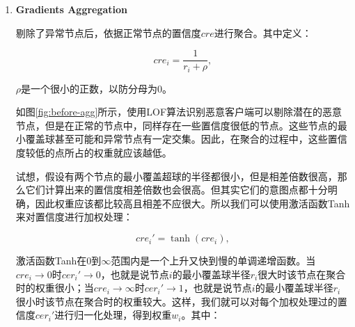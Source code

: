 \documentclass[lettersize,journal]{IEEEtran}
\begin{document}
\begin{enumerate}




\item \textbf{Gradients Aggregation}

剔除了异常节点后，依据正常节点的置信度$cre$进行聚合。其中定义：

\begin{equation}
    cre_i=\frac{1}{r_i+\rho},
\end{equation}

$\rho$是一个很小的正数，以防分母为$0$。

如图\ref{fig:before-agg}所示，使用LOF算法识别恶意客户端可以剔除潜在的恶意节点，但是在正常的节点中，同样存在一些置信度很低的节点。这些节点的最小覆盖球甚至可能和异常节点有一定交集。因此，在聚合的过程中，这些置信度较低的点所占的权重就应该越低。

试想，假设有两个节点的最小覆盖超球的半径都很小，但是相差倍数很高，那么它们计算出来的置信度相差倍数也会很高。但其实它们的意图点都十分明确，因此权重应该都比较高且相差不应很大。所以我们可以使用激活函数Tanh来对置信度进行加权处理：

\begin{equation}
    cre_i'=\tanh(cre_i),
\end{equation}

激活函数Tanh在$0$到$\infty$范围内是一个上升又快到慢的单调递增函数。当$cre_i\to 0$时$cer_i'\to 0$，也就是说节点$i$的最小覆盖球半径$r_i$很大时该节点在聚合时的权重很小；当$cre_i\to \infty$时$cer_i'\to 1$，也就是说节点$i$的最小覆盖球半径$r_i$很小时该节点在聚合时的权重较大。这样，我们就可以对每个加权处理过的置信度$cer_i'$进行归一化处理，得到权重$w_i$。其中：


\end{enumerate}
\end{document}
